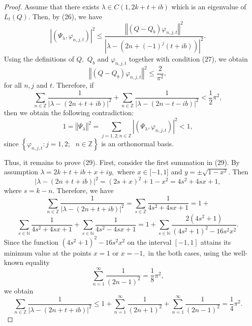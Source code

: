 \documentclass[10pt,a4paper]{amsart}
\begin{document}
\begin{proof}
Assume that there exists $\lambda\in C(1,2k+t+ib)$ which is an eigenvalue of
$L_{t}(Q)$. Then, by (26), we have
\begin{equation}
\left\vert \left(  \Psi_{\lambda},\varphi_{n,j,t}\right)  \right\vert ^{2}%
\leq\frac{\left\Vert (Q-Q_{b})\varphi_{n,j,t}\right\Vert ^{2}}{\left\vert
\lambda-(2n+\left(  -1\right)  ^{j}(t+ib))\right\vert ^{2}}. \tag{28}%
\end{equation}
Using the definitions of $Q,$ $Q_{b}$ and $\varphi_{n,j,t}$ together with
condition (27), we obtain
\[
\left\Vert (Q-Q_{b})\varphi_{n,j,t}\right\Vert ^{2}\leq\frac{2}{\pi^{2}},
\]
for all $n,j$ and $t.$ Therefore, if
\begin{equation}
\sum_{n\in\mathbb{Z}}\frac{1}{\left\vert \lambda-(2n+t+ib)\right\vert ^{2}%
}+\sum_{n\in\mathbb{Z}}\frac{1}{\left\vert \lambda-(2n-t-ib)\right\vert ^{2}%
}<\frac{1}{2}\pi^{2}, \tag{29}%
\end{equation}
then we obtain the following contradiction:
\begin{equation}
1=\left\Vert \Psi_{\lambda}\right\Vert ^{2}=\sum_{j=1,2;n\in\mathbb{Z}%
}\left\vert \left(  \Psi_{\lambda},\varphi_{n,j,t}\right)  \right\vert ^{2}<1,
\tag{30}%
\end{equation}
since $\left\{  \varphi_{n,j,t}:j=1,2;\text{ }n\in\mathbb{Z}\right\}  $ is an
orthonormal basis.

Thus, it remains to prove (29). First, consider the first summation in (29).
By assumption $\lambda=2k+t+ib+x+iy,$ where $x\in\lbrack-1,1]$ and $y=\pm
\sqrt{1-x^{2}}.$ Then
\begin{equation}
\left\vert \lambda-(2n+t+ib)\right\vert ^{2}=\left(  2s+x\right)  ^{2}%
+1-x^{2}=4s^{2}+4sx+1, \tag{31}%
\end{equation}
where $s=k-n$. Therefore, we have
\[
\sum_{n\in\mathbb{Z}}\frac{1}{\left\vert \lambda-(2n+t+ib)\right\vert ^{2}%
}=\sum_{s\in\mathbb{Z}}\frac{1}{4s^{2}+4sx+1}=1+
\]%
\[
\sum_{s\in\mathbb{N}}\frac{1}{4s^{2}+4sx+1}+\sum_{s\in\mathbb{N}}\frac
{1}{4s^{2}-4sx+1}=1+\sum_{s\in\mathbb{N}}\frac{2(4s^{2}+1)}{(4s^{2}%
+1)^{2}-16s^{2}x^{2}}.
\]
Since the function $(4s^{2}+1)^{2}-16s^{2}x^{2}$ on the interval $[-1,1]$
attains its minimum value at the points $x=1$ or $x=-1,$ in the both cases,
using the well-known equality
\[
\sum_{n=1}^{\infty}\frac{1}{(2n-1)^{2}}=\frac{1}{8}\pi^{2},
\]
we obtain
\begin{equation}
\sum_{n\in\mathbb{Z}}\frac{1}{\left\vert \lambda-(2n+t+ib)\right\vert ^{2}%
}\leq1+\sum_{n=1}^{\infty}\frac{1}{(2n+1)^{2}}+\sum_{n=1}^{\infty}\frac
{1}{(2n-1)^{2}}=\frac{1}{4}\pi^{2}. \tag{32}%
\end{equation}



\end{proof}
\end{document}

